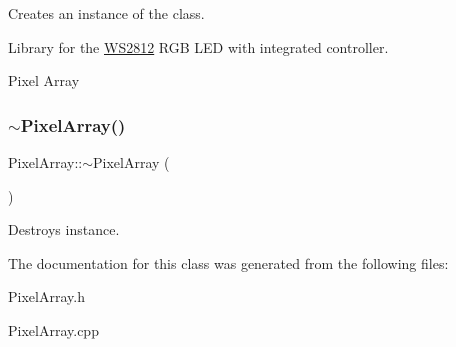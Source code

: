 Creates an instance of the class. 

Library for the \hyperlink{class_w_s2812}{W\+S2812} R\+GB L\+ED with integrated controller.

Pixel Array \mbox{\label{class_pixel_array_a9f4d10fcbd08290dfdecafb2ed4ad687}} 
\subsubsection{\texorpdfstring{$\sim$\+Pixel\+Array()}{~PixelArray()}}
{\footnotesize\ttfamily Pixel\+Array\+::$\sim$\+Pixel\+Array (\begin{DoxyParamCaption}{ }\end{DoxyParamCaption})}

Destroys instance. 

The documentation for this class was generated from the following files\+:\begin{DoxyCompactItemize}
\item 
Pixel\+Array.\+h\item 
Pixel\+Array.\+cpp\end{DoxyCompactItemize}
